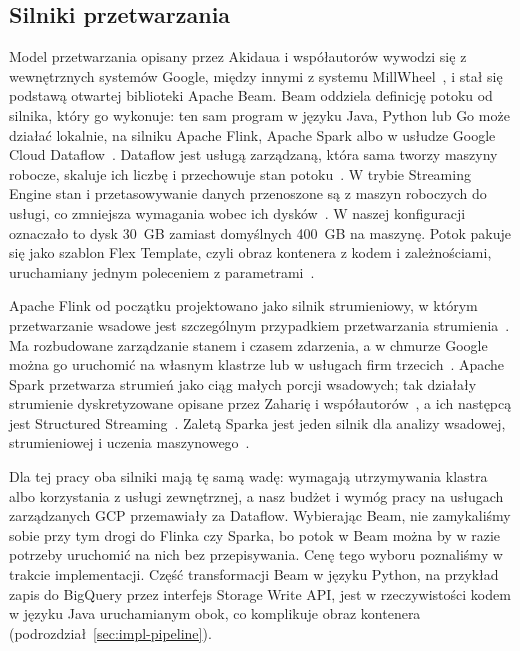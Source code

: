 \subsection{Silniki przetwarzania}
\label{sec:tech-engines}

Model przetwarzania opisany przez Akidaua i współautorów wywodzi się z wewnętrznych systemów Google, między innymi z systemu MillWheel~\cite{akidau2013millwheel}, i stał się podstawą otwartej biblioteki Apache Beam.
Beam oddziela definicję potoku od silnika, który go wykonuje: ten sam program w języku Java, Python lub Go może działać lokalnie, na silniku Apache Flink, Apache Spark albo w usłudze Google Cloud Dataflow~\cite{docbeamguide}.
Dataflow jest usługą zarządzaną, która sama tworzy maszyny robocze, skaluje ich liczbę i przechowuje stan potoku~\cite{docdataflow}.
W trybie Streaming Engine stan i przetasowywanie danych przenoszone są z maszyn roboczych do usługi, co zmniejsza wymagania wobec ich dysków~\cite{docdataflowstreamingengine}.
W naszej konfiguracji oznaczało to dysk 30~GB zamiast domyślnych 400~GB na maszynę.
Potok pakuje się jako szablon Flex Template, czyli obraz kontenera z kodem i zależnościami, uruchamiany jednym poleceniem z parametrami~\cite{docflextemplates}.

Apache Flink od początku projektowano jako silnik strumieniowy, w którym przetwarzanie wsadowe jest szczególnym przypadkiem przetwarzania strumienia~\cite{carbone2015apache}.
Ma rozbudowane zarządzanie stanem i czasem zdarzenia, a w chmurze Google można go uruchomić na własnym klastrze lub w usługach firm trzecich~\cite{docflink}.
Apache Spark przetwarza strumień jako ciąg małych porcji wsadowych; tak działały strumienie dyskretyzowane opisane przez Zaharię i współautorów~\cite{zaharia2013discretized}, a ich następcą jest Structured Streaming~\cite{docsparkstreaming}.
Zaletą Sparka jest jeden silnik dla analizy wsadowej, strumieniowej i uczenia maszynowego~\cite{zaharia2016apache}.

Dla tej pracy oba silniki mają tę samą wadę: wymagają utrzymywania klastra albo korzystania z usługi zewnętrznej, a nasz budżet i wymóg pracy na usługach zarządzanych GCP przemawiały za Dataflow.
Wybierając Beam, nie zamykaliśmy sobie przy tym drogi do Flinka czy Sparka, bo potok w Beam można by w razie potrzeby uruchomić na nich bez przepisywania.
Cenę tego wyboru poznaliśmy w trakcie implementacji.
Część transformacji Beam w języku Python, na przykład zapis do BigQuery przez interfejs Storage Write API, jest w rzeczywistości kodem w języku Java uruchamianym obok, co komplikuje obraz kontenera (podrozdział~\ref{sec:impl-pipeline}).


